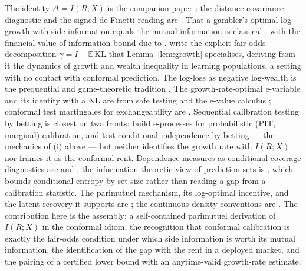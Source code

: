 \documentclass[11pt]{article}
\begin{document}
The identity $\Delta=I(R;X)$ is the companion paper \citep{cotton_marginally}; the
distance-covariance diagnostic and the signed de Finetti reading are \citep{cotton_signed}. That a
gambler's optimal log-growth with side information equals the mutual information is classical
\citep{kelly1956,cover2006}, with the financial-value-of-information bound due to
\citet{barroncover1988}. \citet{kemp2022} write the explicit fair-odds decomposition
$\gamma=I-\mathbb E\,\mathrm{KL}$ that Lemma~\ref{lem:growth} specialises, deriving from it the
dynamics of growth and wealth inequality in learning populations, a setting with no contact with
conformal prediction. The log-loss as negative log-wealth is the prequential and game-theoretic
tradition \citep{dawid1984,shafervovk2019}. The growth-rate-optimal e-variable and its identity with
a KL are from safe testing \citep{gruenwald2024} and the e-value calculus \citep{vovkwang2021};
conformal test martingales for exchangeability are \citet{vng2003}. Sequential calibration testing
by betting is closest on two fronts: \citet{arnold2023} build e-processes for probabilistic (PIT,
marginal) calibration, and \citet{shaer2023} test conditional independence by betting --- the
mechanics of (i) above --- but neither identifies the growth rate with $I(R;X)$ nor frames it as the
conformal rent. Dependence measures as conditional-coverage diagnostics are \citet{feldman2021} and
\citet{braun2025}; the information-theoretic view of prediction sets is \citet{correia2024}, which
bounds conditional entropy by set size rather than reading a gap from a calibration statistic. The
parimutuel mechanism, its log-optimal incentive, and the latent recovery it supports are
\citet{cotton_micro2022,cotton_horserace}; the continuous density conventions are
\citet{micro_density}. The contribution here is the assembly: a self-contained parimutuel derivation
of $I(R;X)$ in the conformal idiom, the recognition that conformal calibration is exactly the
fair-odds condition under which side information is worth its mutual information, the identification
of the gap with the rent in a deployed market, and the pairing of a certified lower bound with an
anytime-valid growth-rate estimate.
\end{document}
